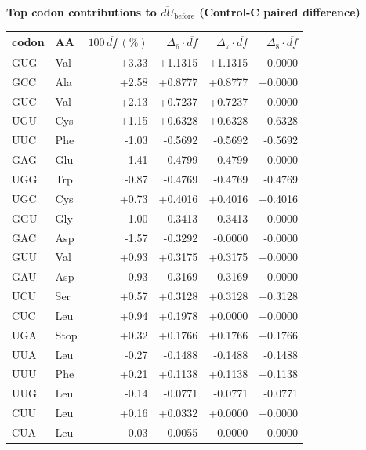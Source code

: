 \begingroup
{}
\small
\setlength{\tabcolsep}{6pt}
\renewcommand{\arraystretch}{1.15}
\setlength{\LTleft}{0pt}
\setlength{\LTright}{0pt}
\noindent\textbf{Top codon contributions to $\overline{dU}_{\mathrm{before}}$ (Control-C paired difference)}\\
\begin{longtable}{l l r r r r}
\toprule
codon & AA & $100\,\overline{df}\,(\%)$ & $\Delta_{6}\cdot\overline{df}$ & $\Delta_{7}\cdot\overline{df}$ & $\Delta_{8}\cdot\overline{df}$ \\
\midrule
GUG & Val & +3.33 & +1.1315 & +1.1315 & +0.0000 \\
GCC & Ala & +2.58 & +0.8777 & +0.8777 & +0.0000 \\
GUC & Val & +2.13 & +0.7237 & +0.7237 & +0.0000 \\
UGU & Cys & +1.15 & +0.6328 & +0.6328 & +0.6328 \\
UUC & Phe & -1.03 & -0.5692 & -0.5692 & -0.5692 \\
GAG & Glu & -1.41 & -0.4799 & -0.4799 & -0.0000 \\
UGG & Trp & -0.87 & -0.4769 & -0.4769 & -0.4769 \\
UGC & Cys & +0.73 & +0.4016 & +0.4016 & +0.4016 \\
GGU & Gly & -1.00 & -0.3413 & -0.3413 & -0.0000 \\
GAC & Asp & -1.57 & -0.3292 & -0.0000 & -0.0000 \\
GUU & Val & +0.93 & +0.3175 & +0.3175 & +0.0000 \\
GAU & Asp & -0.93 & -0.3169 & -0.3169 & -0.0000 \\
UCU & Ser & +0.57 & +0.3128 & +0.3128 & +0.3128 \\
CUC & Leu & +0.94 & +0.1978 & +0.0000 & +0.0000 \\
UGA & Stop & +0.32 & +0.1766 & +0.1766 & +0.1766 \\
UUA & Leu & -0.27 & -0.1488 & -0.1488 & -0.1488 \\
UUU & Phe & +0.21 & +0.1138 & +0.1138 & +0.1138 \\
UUG & Leu & -0.14 & -0.0771 & -0.0771 & -0.0771 \\
CUU & Leu & +0.16 & +0.0332 & +0.0000 & +0.0000 \\
CUA & Leu & -0.03 & -0.0055 & -0.0000 & -0.0000 \\
\bottomrule
\end{longtable}
\endgroup

